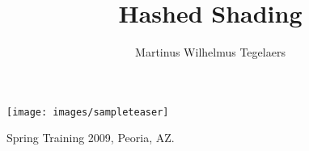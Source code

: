 \documentclass[sigconf]{acmart}
\title{Hashed Shading}
\author{Martinus Wilhelmus Tegelaers}
\affiliation{\institution{KULeuven}}
\begin{document}
\begin{teaserfigure}
   \texttt{[image: images/sampleteaser]}
   \caption{Spring Training 2009, Peoria, AZ.}
   \label{fig:teaser}
\end{teaserfigure}



\maketitle






  










\nocite{*}

\end{document}
